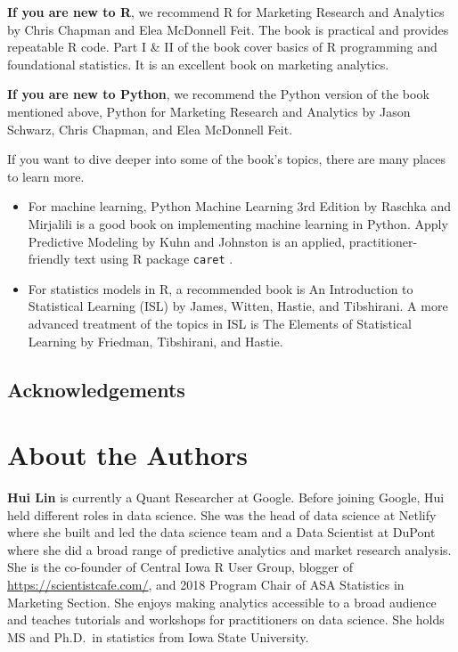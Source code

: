 \documentclass[
  12pt,
]{krantz}
\begin{document}
\textbf{If you are new to R}, we recommend R for Marketing Research and Analytics by Chris Chapman and Elea McDonnell Feit. The book is practical and provides repeatable R code. Part I \& II of the book cover basics of R programming and foundational statistics. It is an excellent book on marketing analytics.

\textbf{If you are new to Python}, we recommend the Python version of the book mentioned above, Python for Marketing Research and Analytics by Jason Schwarz, Chris Chapman, and Elea McDonnell Feit.

If you want to dive deeper into some of the book's topics, there are many places to learn more.

\begin{itemize}
\item
  For machine learning, Python Machine Learning 3rd Edition by Raschka and Mirjalili is a good book on implementing machine learning in Python. Apply Predictive Modeling by Kuhn and Johnston is an applied, practitioner-friendly text using R package \texttt{caret} .
\item
  For statistics models in R, a recommended book is An Introduction to Statistical Learning (ISL) by James, Witten, Hastie, and Tibshirani. A more advanced treatment of the topics in ISL is The Elements of Statistical Learning by Friedman, Tibshirani, and Hastie.
\end{itemize}

\hypertarget{acknowledgements}{%
\section*{Acknowledgements}\label{acknowledgements}}


\hypertarget{about-the-authors}{%
\chapter*{About the Authors}\label{about-the-authors}}


\textbf{Hui Lin} is currently a Quant Researcher at Google. Before joining Google, Hui held
different roles in data science. She was the head of data science at Netlify where she built
and led the data science team and a Data Scientist at DuPont where she did a broad range
of predictive analytics and market research analysis. She is the co-founder of Central
Iowa R User Group, blogger of \url{https://scientistcafe.com/}, and 2018 Program Chair of
ASA Statistics in Marketing Section. She enjoys making analytics accessible to a broad
audience and teaches tutorials and workshops for practitioners on data science. She holds
MS and Ph.D.~in statistics from Iowa State University.
\end{document}
